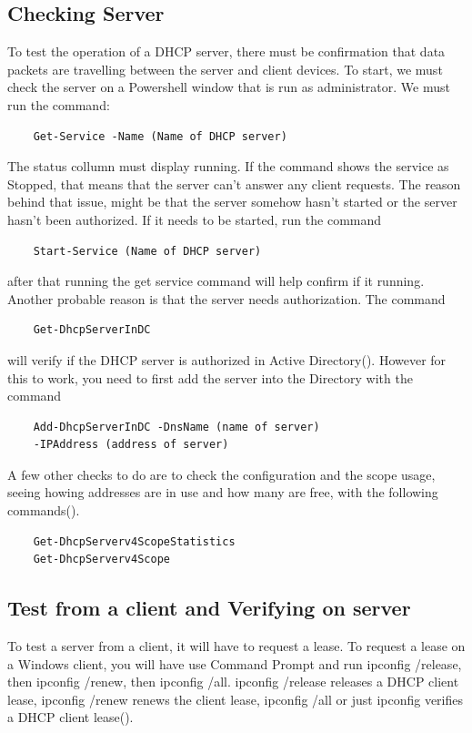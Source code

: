 \subsection{Checking Server}
To test the operation of a DHCP server, there must be confirmation that 
data packets are travelling between the server and client devices.
To start, we must check the server on a Powershell window that is run as administrator.
We must run the command: 
\begin{verbatim}
    Get-Service -Name (Name of DHCP server)
\end{verbatim}
The status collumn must display running. If the command 
shows the service as Stopped, that means that the server can't answer any client requests.
The reason behind that issue, might be that the server somehow hasn't started or the server hasn't been authorized.
If it needs to be started, 
run the command 
\begin{verbatim}
    Start-Service (Name of DHCP server)
\end{verbatim}
after that running the get service command will help confirm if it running.
Another probable reason is that the server needs authorization. 
The command 
\begin{verbatim}
    Get-DhcpServerInDC 
\end{verbatim}
will verify if the DHCP server is authorized in Active 
Directory(\cite{QS}). However for this to work, you need to first add the server into the 
Directory with the command 
\begin{verbatim}
    Add-DhcpServerInDC -DnsName (name of server) 
    -IPAddress (address of server)
\end{verbatim}
A few other checks to do are to check the configuration and the scope usage, 
seeing howing addresses are in use and how many are free, with the following commands(\cite{QS}).

\begin{verbatim}
    Get-DhcpServerv4ScopeStatistics
    Get-DhcpServerv4Scope
\end{verbatim}

\subsection{Test from a client and Verifying on server}
To test a server from a client, it will have to request a lease.
To request a lease on a Windows client, you will have use Command Prompt 
and run ipconfig /release, then ipconfig /renew, then ipconfig /all.
ipconfig /release releases a DHCP client lease, ipconfig /renew renews the client lease,
ipconfig /all or just ipconfig verifies a DHCP client lease(\cite{Leases}).

